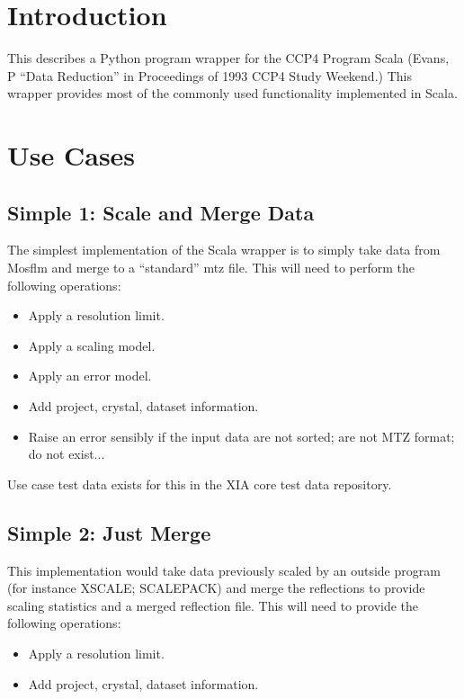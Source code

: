 \documentclass[a4paper, 11pt]{article}
\begin{document}
\section{Introduction}

This describes a Python program wrapper for the CCP4 Program Scala
(Evans, P ``Data Reduction'' in Proceedings of 1993 CCP4 Study Weekend.)
This wrapper provides most of the commonly used functionality implemented
in Scala.

\section{Use Cases}

\subsection{Simple 1: Scale and Merge Data}

The simplest implementation of the Scala wrapper is to simply take data 
from Mosflm and merge to a ``standard'' mtz file. This will need to perform
the following operations:

\begin{itemize}
\item{Apply a resolution limit.}
\item{Apply a scaling model.}
\item{Apply an error model.}
\item{Add project, crystal, dataset information.}
\item{Raise an error sensibly if the input data are not sorted; are
not MTZ format; do not exist...}
\end{itemize}

Use case test data exists for this in the XIA core test data repository.

\subsection{Simple 2: Just Merge}

This implementation would take data previously scaled by an outside program
(for instance XSCALE; SCALEPACK) and merge the reflections to provide
scaling statistics and a merged reflection file. This will need to provide
the following operations:

\begin{itemize}
\item{Apply a resolution limit.}
\item{Add project, crystal, dataset information.}
\end{itemize}
\end{document}
